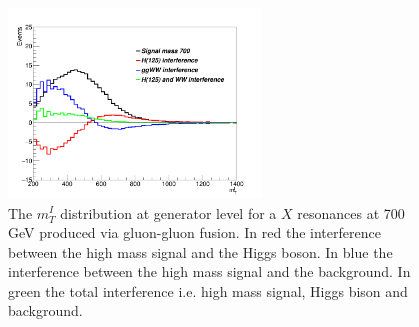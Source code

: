 \begin{figure}[htbp]
\centering
 \includegraphics[width=0.6\textwidth]{../Cap5/nocut_mti_700_sign}
\caption{ The $m_T^I$ distribution at generator level for a $X$ resonances at 700 GeV produced via gluon-gluon fusion. In red the interference between the high
mass signal and the Higgs boson. In blue the interference between the high mass signal
and the background. In green the total interference i.e. high mass signal, Higgs bison and
background.       }
    \label{nocut_mti_700_sign}
\end{figure}
